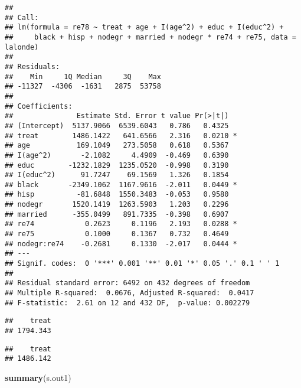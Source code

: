 \documentclass[]{article}
\newenvironment{Shaded}{\begin{snugshade}}{\end{snugshade}}
\newcommand{\CommentTok}[1]{\textcolor[rgb]{0.56,0.35,0.01}{\textit{#1}}}
\newcommand{\KeywordTok}[1]{\textcolor[rgb]{0.13,0.29,0.53}{\textbf{#1}}}
\newcommand{\NormalTok}[1]{#1}
\newcommand{\OperatorTok}[1]{\textcolor[rgb]{0.81,0.36,0.00}{\textbf{#1}}}
\newcommand{\StringTok}[1]{\textcolor[rgb]{0.31,0.60,0.02}{#1}}
\begin{document}
\begin{verbatim}
## 
## Call:
## lm(formula = re78 ~ treat + age + I(age^2) + educ + I(educ^2) + 
##     black + hisp + nodegr + married + nodegr * re74 + re75, data = lalonde)
## 
## Residuals:
##    Min     1Q Median     3Q    Max 
## -11327  -4306  -1631   2875  53758 
## 
## Coefficients:
##               Estimate Std. Error t value Pr(>|t|)  
## (Intercept)  5137.9066  6539.6043   0.786   0.4325  
## treat        1486.1422   641.6566   2.316   0.0210 *
## age           169.1049   273.5058   0.618   0.5367  
## I(age^2)       -2.1082     4.4909  -0.469   0.6390  
## educ        -1232.1829  1235.0520  -0.998   0.3190  
## I(educ^2)      91.7247    69.1569   1.326   0.1854  
## black       -2349.1062  1167.9616  -2.011   0.0449 *
## hisp          -81.6848  1550.3483  -0.053   0.9580  
## nodegr       1520.1419  1263.5903   1.203   0.2296  
## married      -355.0499   891.7335  -0.398   0.6907  
## re74            0.2623     0.1196   2.193   0.0288 *
## re75            0.1000     0.1367   0.732   0.4649  
## nodegr:re74    -0.2681     0.1330  -2.017   0.0444 *
## ---
## Signif. codes:  0 '***' 0.001 '**' 0.01 '*' 0.05 '.' 0.1 ' ' 1
## 
## Residual standard error: 6492 on 432 degrees of freedom
## Multiple R-squared:  0.0676, Adjusted R-squared:  0.0417 
## F-statistic:  2.61 on 12 and 432 DF,  p-value: 0.002279
\end{verbatim}

\begin{Shaded}
\end{Shaded}

\begin{verbatim}
##    treat 
## 1794.343
\end{verbatim}

\begin{Shaded}
\end{Shaded}

\begin{verbatim}
##    treat 
## 1486.142
\end{verbatim}

\begin{Shaded}
\begin{Highlighting}[]
\KeywordTok{summary}\NormalTok{(s.out1)}
\end{Highlighting}
\end{Shaded}
\end{document}
